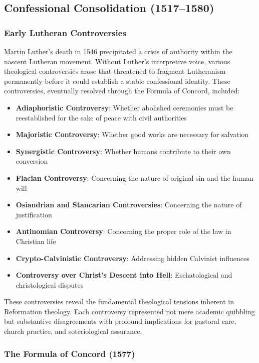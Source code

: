 \subsection{Confessional Consolidation (1517--1580)}

\subsubsection{Early Lutheran Controversies}

Martin Luther's death in 1546 precipitated a crisis of authority within the nascent Lutheran movement. Without Luther's interpretive voice, various theological controversies arose that threatened to fragment Lutheranism permanently before it could establish a stable confessional identity. These controversies, eventually resolved through the Formula of Concord, included:

\begin{itemize}
\item \textbf{Adiaphoristic Controversy}: Whether abolished ceremonies must be reestablished for the sake of peace with civil authorities
\item \textbf{Majoristic Controversy}: Whether good works are necessary for salvation
\item \textbf{Synergistic Controversy}: Whether humans contribute to their own conversion
\item \textbf{Flacian Controversy}: Concerning the nature of original sin and the human will
\item \textbf{Osiandrian and Stancarian Controversies}: Concerning the nature of justification
\item \textbf{Antinomian Controversy}: Concerning the proper role of the law in Christian life
\item \textbf{Crypto-Calvinistic Controversy}: Addressing hidden Calvinist influences
\item \textbf{Controversy over Christ's Descent into Hell}: Eschatological and christological disputes
\end{itemize}

These controversies reveal the fundamental theological tensions inherent in Reformation theology. Each controversy represented not mere academic quibbling but substantive disagreements with profound implications for pastoral care, church practice, and soteriological assurance.

\subsubsection{The Formula of Concord (1577)}

